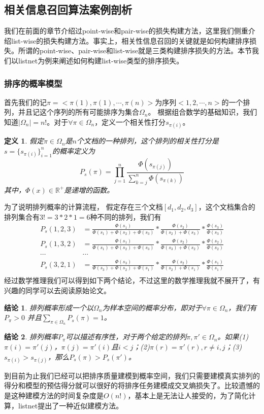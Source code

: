 \documentclass[twoside,a4paper,12pt]{book}%
\newtheorem{definition}{定义}
\newtheorem{conclusion}{结论}
\begin{document}
\subsection{相关信息召回算法案例剖析}
我们在前面的章节介绍过point-wise和pair-wise的损失构建方法，这里我们侧重介绍list-wise的损失构建方法。事实上，相关性信息召回的关键就是如何构建排序损失。所谓的point-wise、pair-wise和list-wise就是三类构建排序损失的方法。本节我们以listnet为例来阐述如何构建list-wise类型的排序损失。
\subsubsection{排序的概率模型}
首先我们的记$\pi =<\pi(1),\pi(1),\cdots,\pi(n)>$为序列$<1,2,\cdots,n>$的一个排列，并且记这个序列的所有可能排序为集合$\Omega_n$。
根据组合数学的基础知识，我们知道$|\Omega_n|=n!$。对于$\forall \pi \in \Omega_n$，定义一个相关性打分$s_{\pi(i)}$。
\begin{definition}
假定$\pi \in \Omega_n$是$n$个文档的一种排列，这个排列的相关性打分是$s=\{s_{\pi(i)}\}_{i=1}^{n}$的概率定义为
$$
P_s(\pi)=\prod_{j=1}^{n}\frac{\Phi(s_{\pi(j)})}{\sum_{k=j}^{n}\Phi(s_{\pi(k)})}
$$
其中，$\Phi(x)\in \mathbb{R}^+$是递增的函数。
\end{definition}
为了说明排列概率的计算流程，
假定存在三个文档$[d_1,d_2,d_3]$，这个文档集合的排列集合有$3!=3*2*1=6$种不同的排列，我们有
$$
\begin{aligned}
P_s(1,2,3)&=\frac{\Phi(s_1)}{\Phi(s_1)+\Phi(s_2)+\Phi(s_3)}*\frac{\Phi(s_2)}{\Phi(s_2)+\Phi(s_3)}*\frac{\Phi(s_3)}{\Phi(s_3)}\\
P_s(1,3,2)&=\frac{\Phi(s_1)}{\Phi(s_1)+\Phi(s_2)+\Phi(s_3)}*\frac{\Phi(s_2)}{\Phi(s_3)+\Phi(s_2)}*\frac{\Phi(s_2)}{\Phi(s_2)}\\
\cdots& \cdots\\
P_s(3,2,1)&=\frac{\Phi(s_3)}{\Phi(s_3)+\Phi(s_2)+\Phi(s_1)}*\frac{\Phi(s_2)}{\Phi(s_2)+\Phi(s_1)}*\frac{\Phi(s_1)}{\Phi(s_1)}\\
\end{aligned}
$$
经过数学推理我们可以得到如下两个结论，不过这里的数学推理我就不展开了，有兴趣的同学可以去阅读原始论文。
\begin{conclusion}
排列概率形成一个以$\Omega_n$为样本空间的概率分布，即对于$\forall \pi \in \Omega_n$，我们有$P_{\pi}>0$ 并且$\sum_{\pi \in \Omega_n}P_s(\pi)=1$。
\end{conclusion}
\begin{conclusion}
排列概率$P_{\pi}$可以描述有序性，对于两个给定的排列$\pi,\pi' \in \Omega_n$。如果(1)$\pi(i)=\pi'(j)$，$\pi(j)=\pi'(i)$且$i<j$；(2)$\pi(r)=\pi'(r), r\ne i,j$；(3)$s_{\pi(i)}>s_{\pi(j)}$，那么$P_s(\pi)>P_s(\pi')$。
\end{conclusion}
到目前为止我们已经可以把排序质量建模到概率空间，我们只需要建模真实排列的得分和模型的预估得分就可以很好的将排序任务建模成交叉熵损失了。比较遗憾的是这种建模方法的时间复杂度是$O(n!)$，基本上是无法让人接受的，为了简化计算，listnet提出了一种近似建模方法。
\end{document}

